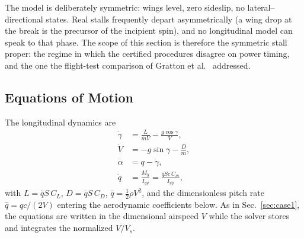 \documentclass[journal ]{new-aiaa}
\begin{document}
The model is deliberately symmetric: wings level, zero sideslip, no
lateral--directional states. Real stalls frequently depart
asymmetrically (a wing drop at the break is the precursor of the
incipient spin), and no longitudinal model can speak to that phase.
The scope of this section is therefore the symmetric stall proper:
the regime in which the certified procedures disagree on power
timing, and the one the flight-test comparison of Gratton et al.\
\cite{Gratton2014} addressed.

\subsection{Equations of Motion}

The longitudinal dynamics are
\begin{align}
    \dot{\gamma} &= \frac{L}{mV} - \frac{g\cos\gamma}{V}, \label{eq:gam_riley}\\
    \dot{V}      &= -g\sin\gamma - \frac{D}{m}, \label{eq:vdot_riley}\\
    \dot{\alpha} &= q - \dot{\gamma}, \label{eq:alpha_dot_riley}\\
    \dot{q}      &= \frac{M_y}{I_{yy}} = \frac{\bar{q}Sc\,C_m}{I_{yy}},
    \label{eq:q_dot_riley}
\end{align}
with $L = \bar{q}S\,C_L$, $D = \bar{q}S\,C_D$,
$\bar{q} = \tfrac{1}{2}\rho V^2$, and the dimensionless pitch rate
$\hat{q} = qc/(2V)$ entering the aerodynamic coefficients below. As
in Sec.~\ref{sec:case1}, the equations are written in the
dimensional airspeed $V$ while the solver stores and integrates the
normalized $V/V_s$.
\end{document}
